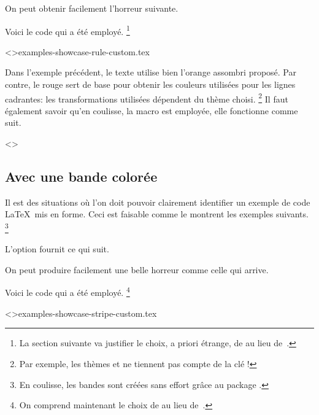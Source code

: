 \begin{tdocexa}
	On peut obtenir facilement l'horreur suivante.

	

	Voici le code qui a été employé.%
	\footnote{
		La section suivante va justifier le choix, a priori étrange, de  au lieu de \,.
	}

	\tdoclatexinput<>{examples-showcase-rule-custom.tex}
\end{tdocexa}


\begin{tdocnote}
    Dans l'exemple précédent, le texte utilise bien l'orange assombri proposé. Par contre, le rouge sert de base pour obtenir les couleurs utilisées pour les lignes cadrantes: les transformations utilisées dépendent du thème choisi.%
    \footnote{
        Par exemple, les thèmes  et  ne tiennent pas compte de la clé  !
    }
    Il faut également savoir qu'en coulisse, la macro  est employée, elle fonctionne comme suit.

    \begin{tdoclatex}<>
    \end{tdoclatex}
\end{tdocnote}


\subsection{Avec une bande colorée}

Il est des situations où l'on doit pouvoir clairement identifier un exemple de code \LaTeX\ mis en forme. Ceci est faisable comme le montrent les exemples suivants.%
\footnote{
    En coulisse, les bandes sont créées sans effort grâce au package .
}


\begin{tdocexa}
	L'option  fournit ce qui suit.

	
\end{tdocexa}


\begin{tdocexa}
	On peut produire facilement une belle horreur comme celle qui arrive.

	

	Voici le code qui a été employé.%
	\footnote{
		On comprend maintenant le choix de  au lieu de \,.
	}

	\tdoclatexinput<>{examples-showcase-stripe-custom.tex}
\end{tdocexa}


